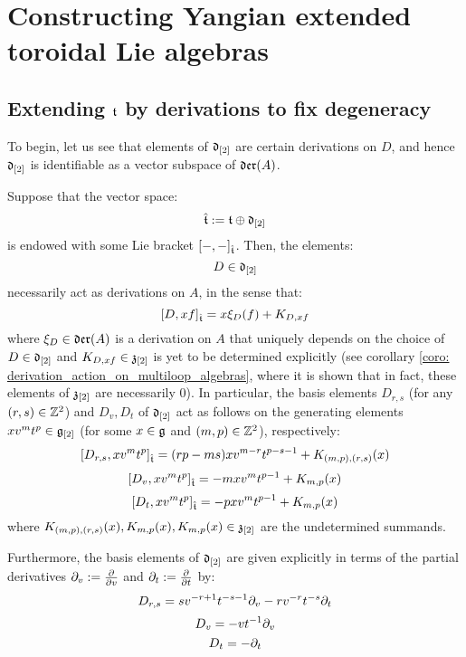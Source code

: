 \section{Constructing Yangian extended toroidal Lie algebras}
    \subsection{Extending \texorpdfstring{$\mathfrak{t}$}{} by derivations to fix degeneracy}
        To begin, let us see that elements of $\mathfrak{d}_{[2]}$ are certain derivations on $D$, and hence $\mathfrak{d}_{[2]}$ is identifiable as a vector subspace of $\mathfrak{der}(A)$.
        \begin{lemma} \label{lemma: derivation_action_on_multiloop_algebras}
            Suppose that the vector space:
                $$\hat{\mathfrak{t}} := \mathfrak{t} \oplus \mathfrak{d}_{[2]}$$
            is endowed with some Lie bracket $[-, -]_{\hat{\mathfrak{t}}}$. Then, the elements:
                $$D \in \mathfrak{d}_{[2]}$$
            necessarily act as derivations on $A$, in the sense that:
                $$[D, xf]_{\hat{\mathfrak{t}}} = x \xi_D(f) + K_{D, xf}$$
            where $\xi_D \in \mathfrak{der}(A)$ is a derivation on $A$ that uniquely depends on the choice of $D \in \mathfrak{d}_{[2]}$ and $K_{D, xf} \in \mathfrak{z}_{[2]}$ is yet to be determined explicitly (see corollary \ref{coro: derivation_action_on_multiloop_algebras}, where it is shown that in fact, these elements of $\mathfrak{z}_{[2]}$ are necessarily $0$). In particular, the basis elements $D_{r, s}$ (for any $(r, s) \in \mathbb{Z}^2$) and $D_v, D_t$ of $\mathfrak{d}_{[2]}$ act as follows on the generating elements $x v^m t^p \in \mathfrak{g}_{[2]}$ (for some $x \in \mathfrak{g}$ and $(m, p) \in \mathbb{Z}^2$), respectively:
                $$[D_{r, s}, x v^m t^p]_{\hat{\mathfrak{t}}} = ( rp - ms ) x v^{m - r} t^{p - s - 1} + K_{(m, p), (r, s)}(x)$$
                $$[D_v, x v^m t^p]_{\hat{\mathfrak{t}}} = -m x v^m t^{p - 1} + K_{m, p}(x)$$
                $$[D_t, x v^m t^p]_{\hat{\mathfrak{t}}} = -p x v^m t^{p - 1} + K_{m, p}(x)$$
            where $K_{(m, p), (r, s)}(x), K_{m, p}(x), K_{m, p}(x) \in \mathfrak{z}_{[2]}$ are the undetermined summands.

            Furthermore, the basis elements of $\mathfrak{d}_{[2]}$ are given explicitly in terms of the partial derivatives $\partial_v := \frac{\partial}{\partial v}$ and $\partial_t := \frac{\partial}{\partial t}$ by:
                $$D_{r, s} = s v^{-r + 1} t^{-s - 1} \partial_v - r v^{-r} t^{-s} \partial_t$$
                $$D_v = -v t^{-1} \partial_v$$
                $$D_t = -\partial_t$$
        \end{lemma}
